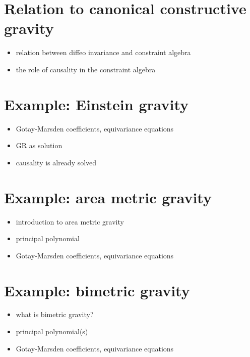 \section{Relation to canonical constructive gravity}
\begin{itemize}
\item relation between diffeo invariance and constraint algebra
\item the role of causality in the constraint algebra
\end{itemize}

\section{Example: Einstein gravity}
\begin{itemize}
\item Gotay-Marsden coefficients, equivariance equations
\item GR as solution
\item causality is already solved
\end{itemize}

\section{Example: area metric gravity}
\begin{itemize}
\item introduction to area metric gravity
\item principal polynomial
\item Gotay-Marsden coefficients, equivariance equations
\end{itemize}

\section{Example: bimetric gravity}
\begin{itemize}
\item what is bimetric gravity?
\item principal polynomial(s)
\item Gotay-Marsden coefficients, equivariance equations
\end{itemize}

